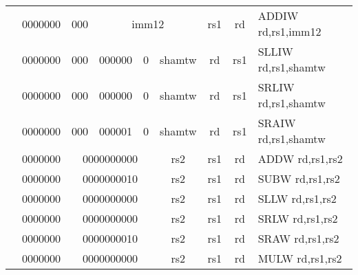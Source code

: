 \begin{table}[p]
\begin{small}
\begin{center}
\begin{tabular}{rcccccccccl}
&
\multicolumn{1}{|c|}{0000000} &
\multicolumn{2}{c|}{000} &
\multicolumn{4}{c|}{imm12} &
\multicolumn{1}{c|}{rs1} &
\multicolumn{1}{c|}{rd} & ADDIW rd,rs1,imm12 \\
\cline{2-10}
  

&
\multicolumn{1}{|c|}{0000000} &
\multicolumn{2}{c|}{000} &
\multicolumn{2}{c|}{000000} &
\multicolumn{1}{c|}{0} &
\multicolumn{1}{c|}{shamtw} &
\multicolumn{1}{c|}{rd} &
\multicolumn{1}{c|}{rs1} & SLLIW rd,rs1,shamtw \\
\cline{2-10}
  

&
\multicolumn{1}{|c|}{0000000} &
\multicolumn{2}{c|}{000} &
\multicolumn{2}{c|}{000000} &
\multicolumn{1}{c|}{0} &
\multicolumn{1}{c|}{shamtw} &
\multicolumn{1}{c|}{rd} &
\multicolumn{1}{c|}{rs1} & SRLIW rd,rs1,shamtw \\
\cline{2-10}
  

&
\multicolumn{1}{|c|}{0000000} &
\multicolumn{2}{c|}{000} &
\multicolumn{2}{c|}{000001} &
\multicolumn{1}{c|}{0} &
\multicolumn{1}{c|}{shamtw} &
\multicolumn{1}{c|}{rd} &
\multicolumn{1}{c|}{rs1} & SRAIW rd,rs1,shamtw \\
\cline{2-10}
  

&
\multicolumn{1}{|c|}{0000000} &
\multicolumn{5}{c|}{0000000000} &
\multicolumn{1}{c|}{rs2} &
\multicolumn{1}{c|}{rs1} &
\multicolumn{1}{c|}{rd} & ADDW rd,rs1,rs2 \\
\cline{2-10}
  

&
\multicolumn{1}{|c|}{0000000} &
\multicolumn{5}{c|}{0000000010} &
\multicolumn{1}{c|}{rs2} &
\multicolumn{1}{c|}{rs1} &
\multicolumn{1}{c|}{rd} & SUBW rd,rs1,rs2 \\
\cline{2-10}
  

&
\multicolumn{1}{|c|}{0000000} &
\multicolumn{5}{c|}{0000000000} &
\multicolumn{1}{c|}{rs2} &
\multicolumn{1}{c|}{rs1} &
\multicolumn{1}{c|}{rd} & SLLW rd,rs1,rs2 \\
\cline{2-10}
  

&
\multicolumn{1}{|c|}{0000000} &
\multicolumn{5}{c|}{0000000000} &
\multicolumn{1}{c|}{rs2} &
\multicolumn{1}{c|}{rs1} &
\multicolumn{1}{c|}{rd} & SRLW rd,rs1,rs2 \\
\cline{2-10}
  

&
\multicolumn{1}{|c|}{0000000} &
\multicolumn{5}{c|}{0000000010} &
\multicolumn{1}{c|}{rs2} &
\multicolumn{1}{c|}{rs1} &
\multicolumn{1}{c|}{rd} & SRAW rd,rs1,rs2 \\
\cline{2-10}
  

&
\multicolumn{1}{|c|}{0000000} &
\multicolumn{5}{c|}{0000000000} &
\multicolumn{1}{c|}{rs2} &
\multicolumn{1}{c|}{rs1} &
\multicolumn{1}{c|}{rd} & MULW rd,rs1,rs2 \\
\cline{2-10}
  


\end{tabular}
\end{center}
\end{small}
\end{table}
